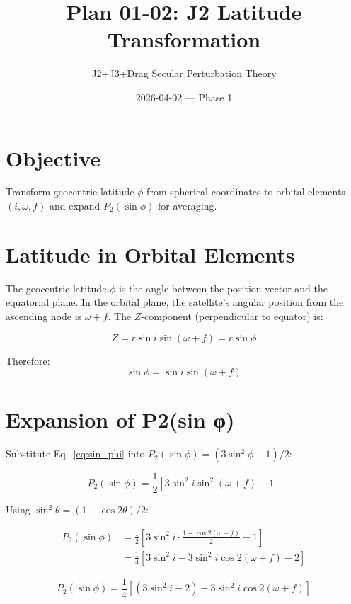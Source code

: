 \documentclass[11pt]{article}
\title{Plan 01-02: J2 Latitude Transformation}
\author{J2+J3+Drag Secular Perturbation Theory}
\date{2026-04-02 — Phase 1}
\begin{document}
\maketitle

\section{Objective}
Transform geocentric latitude $\phi$ from spherical coordinates to orbital elements $(i, \omega, f)$ and expand $P_2(\sin \phi)$ for averaging.

\section{Latitude in Orbital Elements}

The geocentric latitude $\phi$ is the angle between the position vector and the equatorial plane. In the orbital plane, the satellite's angular position from the ascending node is $\omega + f$. The $Z$-component (perpendicular to equator) is:

\begin{equation}
Z = r \sin i \sin(\omega + f) = r \sin \phi
\end{equation}

Therefore:
\begin{equation}
\boxed{\sin \phi = \sin i \sin(\omega + f)}
\label{eq:sin_phi}
\end{equation}

\section{Expansion of P2(sin φ)}

Substitute Eq.~\eqref{eq:sin_phi} into $P_2(\sin \phi) = (3\sin^2 \phi - 1)/2$:

\begin{equation}
P_2(\sin \phi) = \frac{1}{2}\left[3\sin^2 i \sin^2(\omega + f) - 1\right]
\end{equation}

Using $\sin^2 \theta = (1 - \cos 2\theta)/2$:

\begin{align}
P_2(\sin \phi) &= \frac{1}{2}\left[3\sin^2 i \cdot \frac{1 - \cos 2(\omega + f)}{2} - 1\right]\\
&= \frac{1}{4}\left[3\sin^2 i - 3\sin^2 i \cos 2(\omega + f) - 2\right]
\end{align}

\begin{equation}
\boxed{P_2(\sin \phi) = \frac{1}{4}\left[(3\sin^2 i - 2) - 3\sin^2 i \cos 2(\omega + f)\right]}
\label{eq:p2_expanded}
\end{equation}
\end{document}

